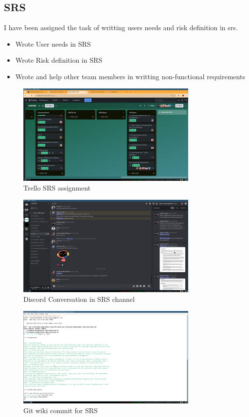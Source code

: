 \documentclass[a4paper,12pt]{article}
\begin{document}
\subsection{SRS}
I have been assigned the task of writting users needs and risk definition in srs.
\begin{itemize}
    \item Wrote User needs in SRS
    \item Wrote Risk definition in SRS
    \item Wrote and help other team members in writting non-functional requirements
\end{itemize}
\begin{figure}[H]
    \centering
    \includegraphics[width=0.8\textwidth]{images/trell_srs.png}
    \caption{Trello SRS assignment}
    \label{fig:trellosrs}
\end{figure}
\begin{figure}[H]
    \centering
    \includegraphics[width=0.8\textwidth]{images/discord_srs.png}
    \caption{Discord Conversation in SRS channel}
    \label{fig:discordsrs}
\end{figure}
\begin{figure}[H]
    \centering
    \includegraphics[width=0.8\textwidth]{images/git_srs.png}
    \caption{Git wiki commit for SRS}
    \label{fig:gitsrs}
\end{figure}
\end{document}
